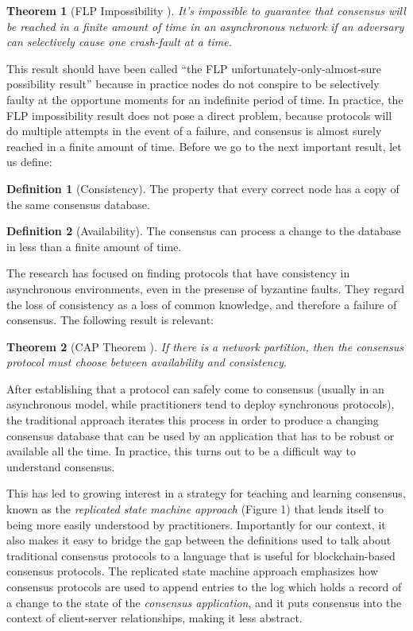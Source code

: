 \documentclass[11pt,a4paper]{article}
\theoremstyle{plain}
\newtheorem{thm}{Theorem}
\theoremstyle{definition}
\newtheorem{defn}{Definition}
\begin{document}
\begin{thm}[FLP Impossibility \cite{FLP}]
It's impossible to guarantee that consensus will be reached in a finite amount of time in an asynchronous network if an adversary can selectively cause one crash-fault at a time.
\end{thm}

This result should have been called ``the FLP unfortunately-only-almost-sure possibility result'' because in practice nodes do not conspire to be selectively faulty at the opportune moments for an indefinite period of time. In practice, the FLP impossibility result does not pose a direct problem, because protocols will do multiple attempts in the event of a failure, and consensus is almost surely reached in a finite amount of time. Before we go to the next important result, let us define:

\begin{defn}[Consistency]
The property that every correct node has a copy of the same consensus database.
\end{defn}

\begin{defn}[Availability]
The consensus can process a change to the database in less than a finite amount of time.
\end{defn}

The research has focused on finding protocols that have consistency in asynchronous environments, even in the presense of byzantine faults. They regard the loss of consistency as a loss of common knowledge, and therefore a failure of consensus. The following result is relevant:

\begin{thm}[CAP Theorem \cite{CAP}]
If there is a network partition, then the consensus protocol must choose between availability and consistency.
\end{thm}

After establishing that a protocol can safely come to consensus (usually in an asynchronous model, while practitioners tend to deploy synchronous protocols), the traditional approach iterates this process in order to produce a changing consensus database that can be used by an application that has to be robust or available all the time. In practice, this turns out to be a difficult way to understand consensus.

This has led to growing interest in a strategy for teaching and learning consensus, known as the \emph{replicated state machine approach} (Figure 1) that lends itself to being more easily understood by practitioners. Importantly for our context, it also makes it easy to bridge the gap between the definitions used to talk about traditional consensus protocols to a language that is useful for blockchain-based consensus protocols. The replicated state machine approach emphasizes how consensus protocols are used to append entries to the log which holds a record of a change to the state of the \emph{consensus application}, and it puts consensus into the context of client-server relationships, making it less abstract.
\end{document}

